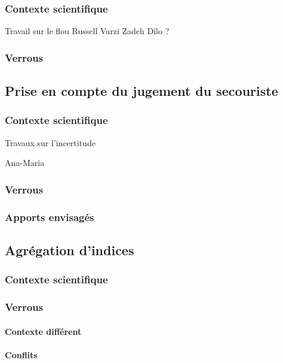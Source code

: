 \subsubsection{Contexte scientifique}

Travail sur le flou
Russell
Varzi
Zadeh
Dilo ?


\subsubsection{Verrous}

\subsection{Prise en compte du jugement du secouriste}
\label{subsec:2-1-3}

\subsubsection{Contexte scientifique}

Travaux sur l'incertitude

Ana-Maria

\subsubsection{Verrous}

\subsubsection{Apports envisagés}

\subsection{Agrégation d'indices}
\label{subsec:2-1-4}

\subsubsection{Contexte scientifique}

\subsubsection{Verrous}

\paragraph{Contexte différent}

\paragraph{Conflits}


